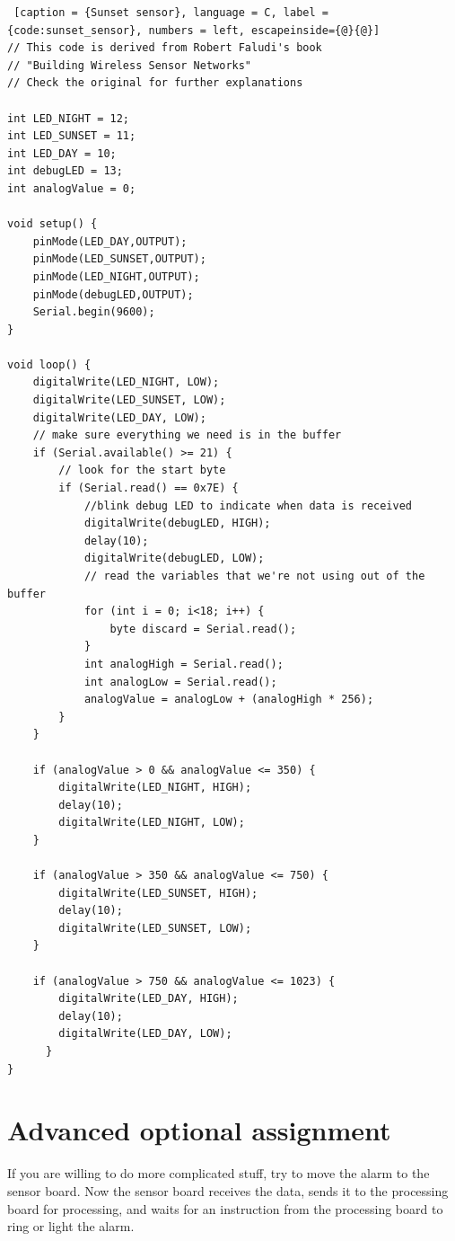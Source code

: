 \begin{lstlisting} [caption = {Sunset sensor}, language = C, label = {code:sunset_sensor}, numbers = left, escapeinside={@}{@}]
// This code is derived from Robert Faludi's book
// "Building Wireless Sensor Networks"
// Check the original for further explanations

int LED_NIGHT = 12;
int LED_SUNSET = 11;
int LED_DAY = 10;
int debugLED = 13;
int analogValue = 0;

void setup() {
    pinMode(LED_DAY,OUTPUT);
    pinMode(LED_SUNSET,OUTPUT);
    pinMode(LED_NIGHT,OUTPUT);
    pinMode(debugLED,OUTPUT);
    Serial.begin(9600);
}

void loop() {
    digitalWrite(LED_NIGHT, LOW);
    digitalWrite(LED_SUNSET, LOW);
    digitalWrite(LED_DAY, LOW);
    // make sure everything we need is in the buffer
    if (Serial.available() >= 21) {
        // look for the start byte
        if (Serial.read() == 0x7E) {
            //blink debug LED to indicate when data is received
            digitalWrite(debugLED, HIGH);
            delay(10);
            digitalWrite(debugLED, LOW);
            // read the variables that we're not using out of the buffer
            for (int i = 0; i<18; i++) {
                byte discard = Serial.read();
            }
            int analogHigh = Serial.read();
            int analogLow = Serial.read();
            analogValue = analogLow + (analogHigh * 256);
        }
    }

    if (analogValue > 0 && analogValue <= 350) {
        digitalWrite(LED_NIGHT, HIGH);
        delay(10);
        digitalWrite(LED_NIGHT, LOW);
    }

    if (analogValue > 350 && analogValue <= 750) {
        digitalWrite(LED_SUNSET, HIGH);
        delay(10);
        digitalWrite(LED_SUNSET, LOW);
    }

    if (analogValue > 750 && analogValue <= 1023) {
        digitalWrite(LED_DAY, HIGH);
        delay(10);
        digitalWrite(LED_DAY, LOW);
      }
}
\end{lstlisting}


\section{Advanced optional assignment}

If you are willing to do more complicated stuff, try to move the alarm to the sensor board. 
Now the sensor board receives the data, sends it to the processing board for processing, and waits for an instruction from the processing board to ring or light the alarm.
